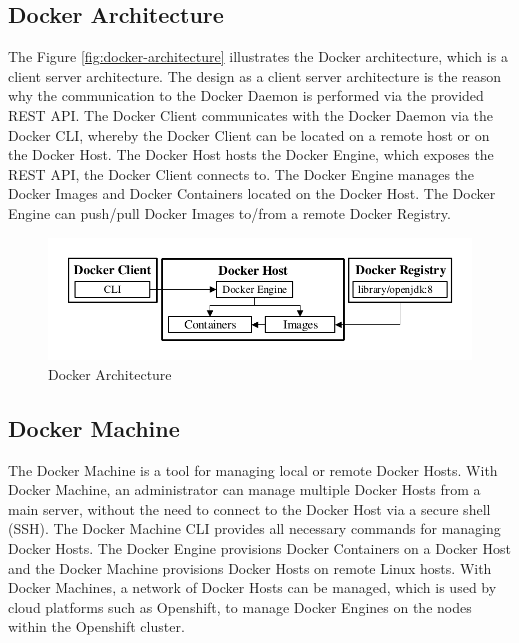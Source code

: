 \subsection{Docker Architecture}
\label{sec:docker-architecture}
The Figure \vref{fig:docker-architecture} illustrates the Docker architecture, which is a client server architecture. The design as a client server architecture is the reason why the communication to the Docker Daemon is performed via the provided REST API. The Docker Client communicates with the Docker Daemon via the Docker CLI, whereby the Docker Client can be located on a remote host or on the Docker Host. The Docker Host hosts the Docker Engine, which exposes the REST API, the Docker Client connects to. The Docker Engine manages the Docker Images and Docker Containers located on the Docker Host. The Docker Engine can push/pull Docker Images to/from a remote Docker Registry.

\begin{figure}[htbp]
	\centering
	\includegraphics[scale=1]{images/docker-architecture.pdf}
	\caption{Docker Architecture}
	\label{fig:docker-architecture}
\end{figure} 

\subsection{Docker Machine}
\label{sec:docker-machine}
The Docker Machine is a tool for managing local or remote Docker Hosts. With Docker Machine, an administrator can manage multiple Docker Hosts from a main server, without the need to connect to the Docker Host via a secure shell (SSH). The Docker Machine CLI provides all necessary commands for managing Docker Hosts. The Docker Engine provisions Docker Containers on a Docker Host and the Docker Machine provisions Docker Hosts on remote Linux hosts. With Docker Machines, a network of Docker Hosts can be managed, which is used by cloud platforms such as Openshift, to manage Docker Engines on the nodes within the Openshift cluster\cite{DockerMachine2018}.  

